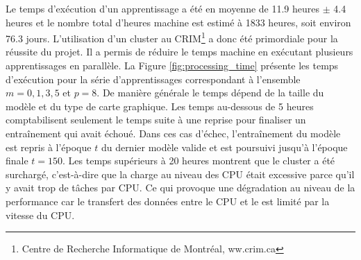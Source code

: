 Le temps d'exécution d'un apprentissage a été en moyenne de 11.9 heures $\pm$ 4.4 heures et le nombre total d'heures machine est estimé à 1833 heures, soit environ 76.3 jours. L'utilisation d'un cluster \acrgpu au CRIM\footnote{Centre de Recherche Informatique de Montréal, ww.crim.ca} a donc été primordiale pour la réussite du projet.  Il a permis de réduire le temps machine en exécutant plusieurs apprentissages en parallèle.  La Figure \ref{fig:processing_time} présente les temps d'exécution pour la série d'apprentissages correspondant à l’ensemble $m={0,1,3,5}$ et $p=8$.  De manière générale le temps dépend de la taille du modèle et du type de carte graphique. Les temps au-dessous de 5 heures comptabilisent seulement le temps suite à une reprise pour finaliser un entraînement qui avait échoué.  Dans ces cas d'échec, l'entraînement du modèle est repris à l'époque $t$ du dernier modèle valide et est poursuivi jusqu'à l'époque finale $t=150$. Les temps supérieurs à 20 heures montrent que le cluster a été surchargé, c'est-à-dire que la charge au niveau des CPU était excessive parce qu'il y avait trop de tâches par CPU. Ce qui provoque une dégradation au niveau de la performance car le transfert des données entre le CPU et le \acrgpu est limité par la vitesse du CPU. 

\vspace{5mm}

